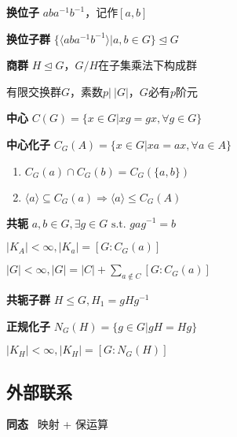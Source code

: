 \documentclass[a4paper,10pt]{ctexart}
\newcommand*{\st}{\text{ s.t. }}
\newcommand*{\impl}{\Rightarrow}
\renewcommand*{\leq}{\leqslant}
\newcommand*{\nmsubgroupeq}{\trianglelefteq}
\newcommand*{\gengroup}[1]{\langle #1 \rangle}
\begin{document}
\begin{multicols}{3}
    \textbf{换位子} $aba^{-1}b^{-1}$，记作$[a,b]$

    \textbf{换位子群} $\{ \gengroup{aba^{-1}b^{-1}} | a, b \in G \} \nmsubgroupeq G$

    \textbf{商群} $H \!\nmsubgroupeq\! G$，$G/H$在子集乘法下构成群

    \begin{theorem}[素阶元]
        有限交换群$G$，素数$p|\ |G|$，$G$必有$p$阶元
    \end{theorem}

    \textbf{中心} $C(G) = \{ x \in G | xg = gx, \forall g \in G\}$

    \textbf{中心化子} $C_G(A) \! = \! \{x \!\in\! G | xa \! = \! ax, \forall a \!\in\! A\}$

    \begin{theorem}[中心化子性质]
        \hfil

        \begin{enumerate}
            \item $C_G(a) \cap C_G(b) = C_G(\{a, b\})$
            \item $\gengroup{a} \subseteq C_G(a) \impl \gengroup{a} \leq C_G(A)$
        \end{enumerate}
    \end{theorem}

    \textbf{共轭} $a, b \in G, \exists g \in G \st gag^{-1}=b$

    \begin{theorem}[共轭类]
        $|K_A| < \infty, |K_a| = [G:C_G(a)]$
    \end{theorem}

    \begin{theorem}[类方程]
        $|G| \! < \! \infty, |G| \! = \! |C| + \sum\limits_{a \notin C} [G:C_G(a)]$
    \end{theorem}

    \textbf{共轭子群} $H \leq G, H_1 = gHg^{-1}$

    \textbf{正规化子} $N_G(H) = \{g \in G | gH = Hg\}$

    \begin{theorem}[共轭子群类]
        $|K_H| \!\! < \!\! \infty, |K_H| \!\! = \!\! [G:N_G(H)]$
    \end{theorem}

    \subsection{外部联系}

    \textbf{同态} \ 映射 + 保运算


\end{multicols}
\end{document}
